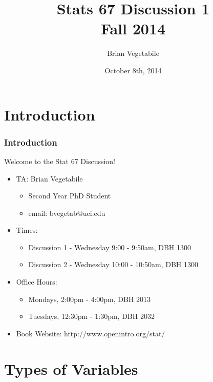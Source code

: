 \documentclass[mathserif]{beamer}
\begin{document}
\title[Stats 67 Discussion]{Stats 67 Discussion 1\\Fall 2014}
\author[Brian Vegetabile \\UC Irvine]{Brian Vegetabile}
\date{October 8th, 2014}

\begin{frame}
\titlepage
\end{frame}

\section{Introduction}

\begin{frame}[t]
\frametitle{Introduction}
Welcome to the Stat 67 Discussion!
\newline

\begin{itemize}
	\item{TA: Brian Vegetabile}
	\begin{itemize}
		\item{Second Year PhD Student}
		\item{email: bvegetab@uci.edu}
	\end{itemize}
	
	\item{Times:}
	\begin{itemize}
		\item{Discussion 1 - Wednesday 9:00 - 9:50am, DBH 1300}
		\item{Discussion 2 - Wednesday 10:00 - 10:50am, DBH 1300}
	\end{itemize}
	
	\item{Office Hours:}
	\begin{itemize}
		\item{Mondays, 2:00pm - 4:00pm, DBH 2013}
		\item{Tuesdays, 12:30pm - 1:30pm, DBH 2032}
	\end{itemize}
	\item{Book Website: http://www.openintro.org/stat/}
\end{itemize}

\end{frame}

\section{Types of Variables}
\end{document}
